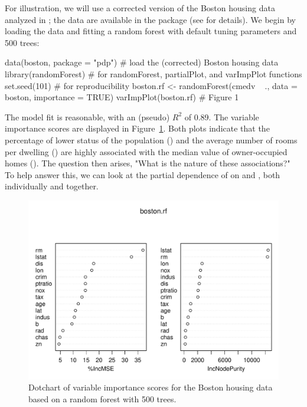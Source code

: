 For illustration, we will use a corrected version of the Boston housing data analyzed in \citet{harrison-1978-hedonic}; the data are available in the  package (see  for details). We begin by loading the data and fitting a random forest with default tuning parameters and 500 trees:
\begin{example}
data(boston, package = "pdp")  # load the (corrected) Boston housing data
library(randomForest)  # for randomForest, partialPlot, and varImpPlot functions
set.seed(101)  # for reproducibility
boston.rf <- randomForest(cmedv ~ ., data = boston, importance = TRUE)
varImpPlot(boston.rf)  # Figure 1
\end{example}
The model fit is reasonable, with an  (pseudo) $R^2$ of 0.89. The variable importance scores are displayed in Figure~\ref{fig:plotmo_vs_partial}. Both plots indicate that the percentage of lower status of the population () and the average number of rooms per dwelling () are highly associated with the median value of owner-occupied homes (). The question then arises, "What is the nature of these associations?" To help answer this, we can look at the partial dependence of  on  and , both individually and together.

\begin{figure}[!htbp]
  \centering
  \includegraphics[width=1.0\linewidth]{boston_rf_vimp}
  \caption{Dotchart of variable importance scores for the Boston housing data based on a random forest with 500 trees.}
  \label{fig:plotmo_vs_partial}
\end{figure}



